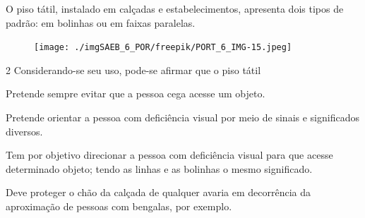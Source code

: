 

O piso tátil, instalado em calçadas e estabelecimentos,
apresenta dois tipos de padrão: em bolinhas ou em faixas paralelas.

\begin{figure}[H]
\texttt{[image: ./imgSAEB\_6\_POR/freepik/PORT\_6\_IMG-15.jpeg]}
\end{figure}

\num{2} Considerando-se seu uso, pode-se afirmar que o piso tátil

\begin{escolha}
\item Pretende sempre evitar que a pessoa cega acesse um objeto.
\item Pretende orientar a pessoa com deficiência visual por meio de sinais
e significados diversos.
\item Tem por objetivo direcionar a pessoa com deficiência visual para que
acesse determinado objeto; tendo as linhas e as bolinhas o mesmo
significado.
\item Deve proteger o chão da calçada de qualquer avaria em decorrência da
aproximação de pessoas com bengalas, por exemplo.
\end{escolha}


